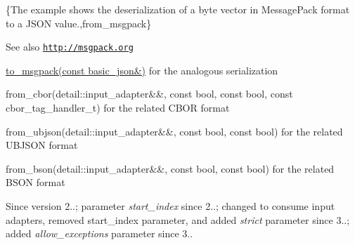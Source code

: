 \{The example shows the deserialization of a byte vector in Message\+Pack format to a J\+S\+ON value.,from\+\_\+msgpack\}

\begin{DoxySeeAlso}{See also}
\href{http://msgpack.org}{\tt http\+://msgpack.\+org} 

\hyperlink{classnlohmann_1_1basic__json_a99b15bcaee410426b937eacc6e47d771}{to\+\_\+msgpack(const basic\+\_\+json\&)} for the analogous serialization 

from\+\_\+cbor(detail\+::input\+\_\+adapter\&\&, const bool, const bool, const cbor\+\_\+tag\+\_\+handler\+\_\+t) for the related C\+B\+OR format 

from\+\_\+ubjson(detail\+::input\+\_\+adapter\&\&, const bool, const bool) for the related U\+B\+J\+S\+ON format 

from\+\_\+bson(detail\+::input\+\_\+adapter\&\&, const bool, const bool) for the related B\+S\+ON format
\end{DoxySeeAlso}
\begin{DoxySince}{Since}
version 2..; parameter {\itshape start\+\_\+index} since 2..; changed to consume input adapters, removed start\+\_\+index parameter, and added {\itshape strict} parameter since 3..; added {\itshape allow\+\_\+exceptions} parameter since 3.. 
\end{DoxySince}
